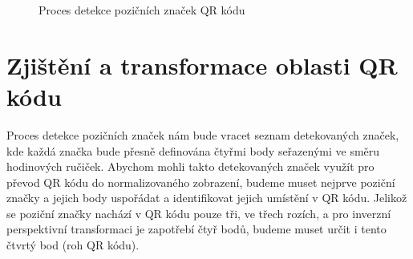 \begin{figure}[H]
  \begin{center}
    \caption{Proces detekce pozičních značek QR kódu}
    \label{QRCodeDetectionProcess}
  \end{center}
\end{figure}

\clearpage
\section{Zjištění a transformace oblasti QR kódu}
\label{zjisteniATransformace}

Proces detekce pozičních značek nám bude vracet seznam detekovaných značek, kde
každá značka bude přesně definována čtyřmi body seřazenými ve směru hodinových
ručiček. Abychom mohli takto detekovaných značek využít pro převod QR kódu do
normalizovaného zobrazení, budeme muset nejprve poziční značky a jejich body
uspořádat a identifikovat jejich umístění v QR kódu. Jelikož se poziční značky
nachází v QR kódu pouze tři, ve třech rozích, a pro inverzní perspektivní
transformaci je zapotřebí čtyř bodů, budeme muset určit i tento čtvrtý bod
(roh QR kódu).

